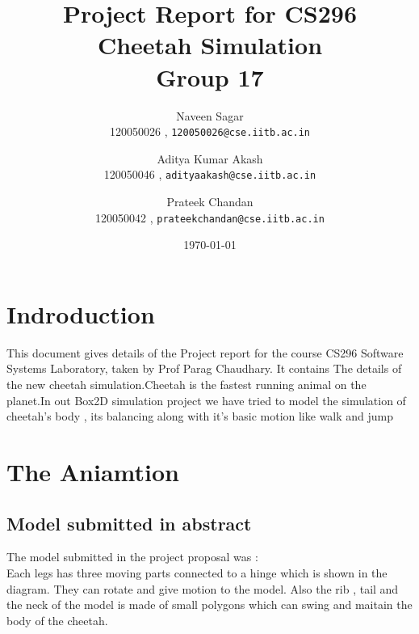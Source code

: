 \documentclass[11pt]{article}
\begin{document}
\title{Project Report for CS296 \\ Cheetah Simulation \\ Group 17}
\author{Naveen Sagar\\120050026 ,
 \texttt{120050026@cse.iitb.ac.in} \\
\and
Aditya Kumar Akash\\120050046 , \texttt{adityaakash@cse.iitb.ac.in} \\ 
\and
Prateek Chandan\\120050042 , \texttt{prateekchandan@cse.iitb.ac.in} \\
}
\date{\today}
\maketitle 
\newpage

\section{Indroduction}
This document gives details of the Project report for the course CS296 Software Systems Laboratory, taken by Prof Parag Chaudhary\cite{sir}. 
It contains The details of the new cheetah simulation.Cheetah is the fastest running animal on the planet.In out Box2D simulation project we have tried to model the simulation of cheetah's body , its balancing along with it's basic motion like walk and jump \\
\section{The Aniamtion}

\subsection{Model submitted in abstract}
The model submitted in the project proposal was : \\
Each legs has three moving parts connected to a hinge which is shown in the diagram. They can rotate and give motion to the model. Also the rib , tail and the neck of the model is made of small polygons which can swing and maitain the body of the cheetah.
\end{document}
